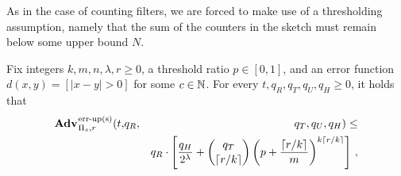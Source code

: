 As in the case of counting filters, we are forced to make use of a thresholding assumption, namely that the sum of the counters in the sketch must remain below some upper bound $N$.

\begin{theorem}\label{thm:count-ms-bound}
Fix integers $k, m, n, \lambda, r\geq 0$, a threshold ratio $p \in [0,1]$, and an error function $d(x,y) = [|x - y| > 0]$ for some $c \in \mathbb{N}$.
  For every $t, q_R, q_T, q_U, q_H \geq 0$, it holds that
  \begin{eqnarray*}
    \Adv{\erreps}_{\struct_s,r}(t,&q_R,& q_T, q_U, q_H) \leq \\ && q_R \cdot \left[\frac{q_H}{2^\lambda} + \binom{q_T}{\lceil r/k \rceil}\left(p+\frac{\lceil r/k \rceil}{m}\right)^{k\lceil r/k \rceil}\right] \,,
\end{eqnarray*}
\end{theorem}

